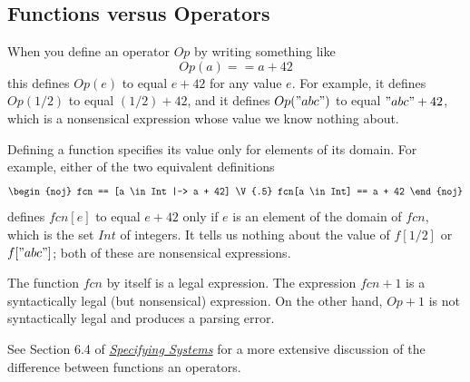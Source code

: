 \documentclass[fleqn,leqno]{article}
\begin{document}
\subsection*{Functions versus Operators}

When 
you define an operator $Op$ by writing something like
 \[ Op(a) == a + 42 \]
this defines $Op(e)$ to equal $e+42$ for any value $e$.  For example,
it defines $Op(1/2)$ to equal $(1/2)+42$, and it defines
$Op("abc")$ to equal $"abc"+42$, which is a nonsensical expression
whose value we know nothing about.

Defining a function specifies its value only for elements of its
domain.  For example, either of the two equivalent definitions
  \[ \begin{noj}
     fcn == [a \in Int |-> a + 42] \V{.5}
     fcn[a \in Int] == a + 42
     \end{noj}\]
defines $fcn[e]$ to equal $e+42$ only if $e$ is an element of the
domain of $fcn$, which is the set $Int$ of integers.  It tells us
nothing about the value of $f[1/2]$  or $f["abc"]$; both of these
are nonsensical expressions.

The function $fcn$ by itself is a legal expression.  The expression
$fcn+1$ is a syntactically legal (but nonsensical) expression.
On the other hand, $Op + 1$ is not syntactically legal and produces
a parsing error.

See Section 6.4 of
  \hyperref{http://research.microsoft.com/en-us/um/people/lamport/tla/book.html}{}{}{\emph{Specifying 
   Systems}} for a more extensive discussion of the difference between
functions an operators.
\end{document}
